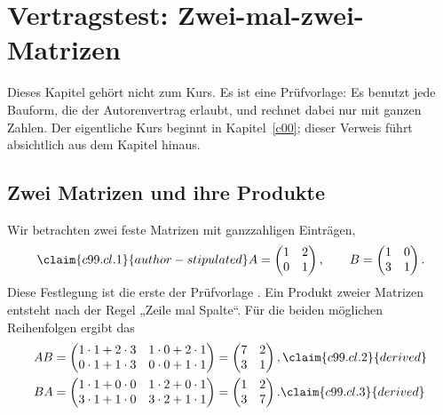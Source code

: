 %

\chapter{Vertragstest: Zwei-mal-zwei-Matrizen}\label{c99}

Dieses Kapitel gehört nicht zum Kurs. Es ist eine Prüfvorlage: Es benutzt jede
Bauform, die der Autorenvertrag erlaubt, und rechnet dabei nur mit ganzen Zahlen.
Der eigentliche Kurs beginnt in Kapitel~\ref{c00}; dieser Verweis führt absichtlich
aus dem Kapitel hinaus.

\section{Zwei Matrizen und ihre Produkte}\label{c99.s1}

Wir betrachten zwei feste Matrizen mit ganzzahligen Einträgen,
\begin{equation}\label{c99.eq.matrizen}\claim{c99.cl.1}{author-stipulated}
  A = \begin{pmatrix} 1 & 2 \\ 0 & 1 \end{pmatrix},
  \qquad
  B = \begin{pmatrix} 1 & 0 \\ 3 & 1 \end{pmatrix}.
\end{equation}
Diese Festlegung ist die erste der Prüfvorlage .
Ein Produkt zweier Matrizen entsteht nach der Regel „Zeile mal Spalte“. Für die
beiden möglichen Reihenfolgen ergibt das
\begin{align}
  AB &= \begin{pmatrix} 1\cdot 1 + 2\cdot 3 & 1\cdot 0 + 2\cdot 1 \\
                        0\cdot 1 + 1\cdot 3 & 0\cdot 0 + 1\cdot 1 \end{pmatrix}
      = \begin{pmatrix} 7 & 2 \\ 3 & 1 \end{pmatrix},
  \label{c99.eq.ab}\claim{c99.cl.2}{derived} \\
  BA &= \begin{pmatrix} 1\cdot 1 + 0\cdot 0 & 1\cdot 2 + 0\cdot 1 \\
                        3\cdot 1 + 1\cdot 0 & 3\cdot 2 + 1\cdot 1 \end{pmatrix}
      = \begin{pmatrix} 1 & 2 \\ 3 & 7 \end{pmatrix}.
  \label{c99.eq.ba}\claim{c99.cl.3}{derived}
\end{align}


